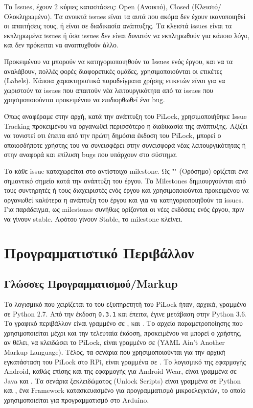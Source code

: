 		Τα Issues, έχουν 2 κύριες καταστάσεις: Open (Ανοικτό), Closed (Κλειστό/Ολοκληρωμένο). Τα ανοικτά issues είναι τα αυτά που ακόμα δεν έχουν ικανοποιηθεί οι απαιτήσεις τους, ή είναι σε διαδικασία ανάπτυξης. Τα κλειστά issues είναι τα εκπληρωμένα issues ή όσα issues δεν είναι δυνατόν να εκπληρωθούν για κάποιο λόγο, και δεν πρόκειται να αναπτυχθούν άλλο.

		Προκειμένου να μπορούν να κατηγοριοποιηθούν τα Issues ενός έργου, και να τα αναλάβουν, πολλές φορές διαφορετικές ομάδες, χρησιμοποιούνται οι ετικέτες (Labels). Κάποια χαρακτηριστικά παραδείγματα χρήσης ετικετών είναι για να χωριστούν τα issues που απαιτούν νέα λειτουργικότητα από τα issues που χρησιμοποιούνται προκειμένου να επιδιορθωθεί ένα bug.

		Όπως αναφέραμε στην αρχή, κατά την ανάπτυξη του PiLock, χρησιμοποιήθηκε Issue Tracking προκειμένου να οργανωθεί περισσότερο η διαδικασία της ανάπτυξης. Αξίζει να τονιστεί οτι έπειτα από την πρώτη δημόσια έκδοση του PiLock, μπορεί ο οποιοσδήποτε χρήστης του να συνεισφέρει στην συνεισφορά νέας λειτουργικότητας ή στην αναφορά και επίλυση bugs που υπάρχουν στο σύστημα.

		Το κάθε issue καταχωρείται στο αντίστοιχο milestone. Ως "" (Ορόσημο) ορίζεται ένα σημαντικό σημείο κατά την ανάπτυξη του έργου. Τα Milestones δημιουργούνται από τους συντηρητές ή τους διαχειριστές ενός έργου και χρησιμοποιούνται προκειμένου να οργανωθεί καλύτερα η ανάπτυξη του έργου και για να κατηγοριοποιηθούν τα issues. Για παράδειγμα, ως milestones συνήθως ορίζονται οι νέες εκδόσεις ενός έργου, πριν να γίνουν stable. Αφότου γίνουν Stable, το milestone κλείνει.

\section{Προγραμματιστικό Περιβάλλον}
	\label{sec:ides}
	\subsection{Γλώσσες Προγραμματισμού/Markup}
		Το λογισμικό που χειρίζεται το  του εξυπηρετητή του PiLock ήταν, αρχικά, γραμμένο σε Python 2.7. Από την έκδοση \verb|0.3.1| και έπειτα, έγινε μετάβαση στην Python 3.6. Το γραφικό περιβάλλον είναι γραμμένο σε ,  και . Το αρχείο παραμετροποίησης που χρησιμοποιείται μέχρι και την τελευταία έκδοση, προκειμένου να μπορεί ο χρήστης, αν θέλει, να κλειδώσει το PiLock, είναι γραμμένο σε  (YAML Ain't Another Markup Language). Τέλος, τα σενάρια που χρησιμοποιούνται για την αρχική εγκατάσταση του PiLock στο RPi, είναι γραμμένα σε . Το λογισμικό της εφαρμογής Android, καθώς επίσης και της εφαρμογής για Android Wear, είναι γραμμένα σε Java και . Τα σενάρια ξεκλειδώματος (Unlock Scripts) είναι γραμμένα σε Python και , ένα Framework κατασκευασμένο για προγραμματισμό μικροελεγκτών, το οποίο χρησιμοποιείται για προγραμματισμό στο Arduino.

